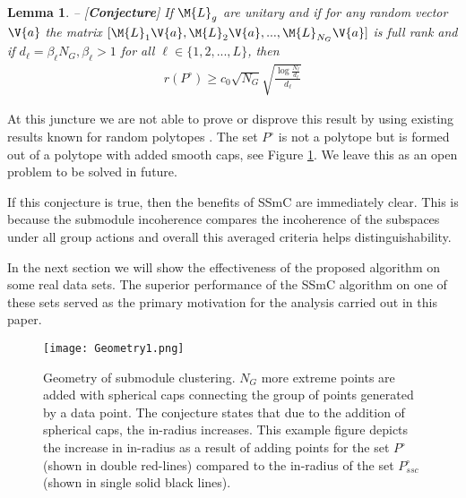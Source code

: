 \documentclass[conference]{IEEEtran}
\newtheorem{lemma}[theorem]{Lemma}
\begin{document}
\begin{lemma} -- [\textbf{Conjecture}]
If $\M{L}_g$ are unitary and if for any random vector $\V{a}$ the matrix $[ \M{L}_1 \V{a}, \M{L}_2 \V{a},...,\M{L}_{N_G} \V{a} ]$ is full rank and if $d_\ell = \beta_\ell N_G, \beta_\ell > 1$ for all $\ell \in \{1,2,...,L\}$, then 
\begin{align}
r(P^{\circ}) \geq c_0 \sqrt{N_G} \sqrt{\frac{\log \frac{N_\ell}{d_\ell}}{d_\ell}}
\end{align}
\end{lemma}
At this juncture we are not able to prove or disprove this result by using existing results known for random polytopes \cite{Dafnis:2009hf,AlonsoGutierrez:2008tm,Pivovarov:2010fd}. The set $P^\circ$ is not a polytope but is formed out of a polytope with added smooth caps, see Figure \ref{fig:geom}. We leave this as an open problem to be solved in future. 

If this conjecture is true, then the benefits of SSmC are immediately clear. This is because the submodule incoherence compares the incoherence of the subspaces under all group actions and overall this averaged criteria helps distinguishability. 


In the next section we will show the effectiveness of the proposed algorithm on some real data sets. The superior performance of the SSmC algorithm on one of these sets served as the primary motivation for the analysis carried out in this paper.  

\begin{figure}[htbp]	
\centering
 	\texttt{[image: Geometry1.png]}
 	\caption{Geometry of submodule clustering. $N_G$ more extreme points are added with spherical caps connecting the group of points generated by a data point. The conjecture states that due to the addition of spherical caps, the in-radius increases. This example figure depicts the increase in in-radius as a result of adding points for the set $P^\circ$ (shown in double red-lines) compared to the in-radius of the set $P_{ssc}^{\circ}$ (shown in single solid black lines).}
	\label{fig:geom}
	\end{figure} 

 
\end{document}
